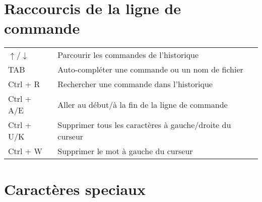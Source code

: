 \documentclass [a4paper]{article}
\begin{document}
\section*{Raccourcis de la ligne de commande}

\noindent
\begin{tabular}{ ll }
\hline
{$\uparrow$/$\downarrow$}           & Parcourir les commandes de l'historique \\
TAB                                 & Auto-compléter une commande ou un nom de fichier \\
{Ctrl + R}                          & Rechercher une commande dans l'historique \\
{Ctrl + A/E}                        & Aller au début/à la fin de la ligne de commande \\
{Ctrl + U/K}                        & Supprimer tous les caractères à gauche/droite du curseur \\
{Ctrl + W}                          & Supprimer le mot à gauche du curseur \\
\hline
\end{tabular}

\section*{Caractères speciaux}
\end{document}
